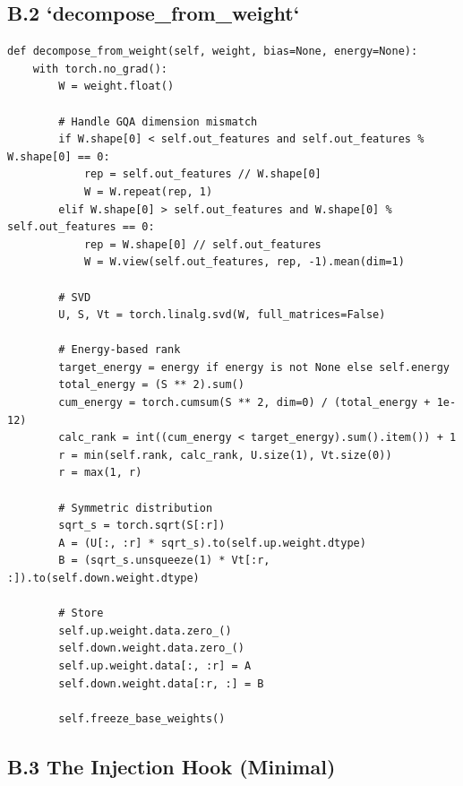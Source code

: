\subsection{B.2 `decompose\_from\_weight`}

\begin{lstlisting}
def decompose_from_weight(self, weight, bias=None, energy=None):
    with torch.no_grad():
        W = weight.float()
        
        # Handle GQA dimension mismatch
        if W.shape[0] < self.out_features and self.out_features % W.shape[0] == 0:
            rep = self.out_features // W.shape[0]
            W = W.repeat(rep, 1)
        elif W.shape[0] > self.out_features and W.shape[0] % self.out_features == 0:
            rep = W.shape[0] // self.out_features
            W = W.view(self.out_features, rep, -1).mean(dim=1)
        
        # SVD
        U, S, Vt = torch.linalg.svd(W, full_matrices=False)
        
        # Energy-based rank
        target_energy = energy if energy is not None else self.energy
        total_energy = (S ** 2).sum()
        cum_energy = torch.cumsum(S ** 2, dim=0) / (total_energy + 1e-12)
        calc_rank = int((cum_energy < target_energy).sum().item()) + 1
        r = min(self.rank, calc_rank, U.size(1), Vt.size(0))
        r = max(1, r)
        
        # Symmetric distribution
        sqrt_s = torch.sqrt(S[:r])
        A = (U[:, :r] * sqrt_s).to(self.up.weight.dtype)
        B = (sqrt_s.unsqueeze(1) * Vt[:r, :]).to(self.down.weight.dtype)
        
        # Store
        self.up.weight.data.zero_()
        self.down.weight.data.zero_()
        self.up.weight.data[:, :r] = A
        self.down.weight.data[:r, :] = B
        
        self.freeze_base_weights()
\end{lstlisting}

\subsection{B.3 The Injection Hook (Minimal)}

